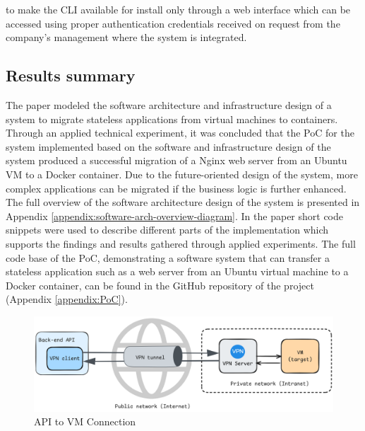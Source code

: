 \documentclass{article}
\begin{document}
\begin{multicols}{2}
to make the CLI available for install only through a web interface which can be accessed using proper authentication credentials received on request from the company's management where the system is integrated.

\subsection{Results summary}
The paper modeled the software architecture and infrastructure design of a system to migrate stateless applications from virtual machines to containers. Through an applied technical experiment, it was concluded that the PoC for the system implemented based on the software and infrastructure design of the system produced a successful migration of a Nginx web server from an Ubuntu VM to a Docker container. Due to the future-oriented design of the system, more complex applications can be migrated if the business logic is further enhanced. The full overview of the software architecture design of the system is presented in Appendix \ref{appendix:software-arch-overview-diagram}. In the paper short code snippets were used to describe different parts of the implementation which supports the findings and results gathered through applied experiments. The full code base of the PoC, demonstrating a software system that can transfer a stateless application such as a web server from an Ubuntu virtual machine to a Docker container, can be found in the GitHub repository of the project (Appendix \ref{appendix:PoC}).


\begin{figure}[H]
    \centering
    \includegraphics[width=\linewidth]{images/api-vm-connection.png}
    \caption{API to VM Connection}
    \label{fig:api-vm-connection}
\end{figure}


\end{multicols}
\end{document}
